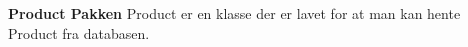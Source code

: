 \textbf{Product Pakken}\newline
Product er en klasse der er lavet for at man kan hente Product fra databasen.  